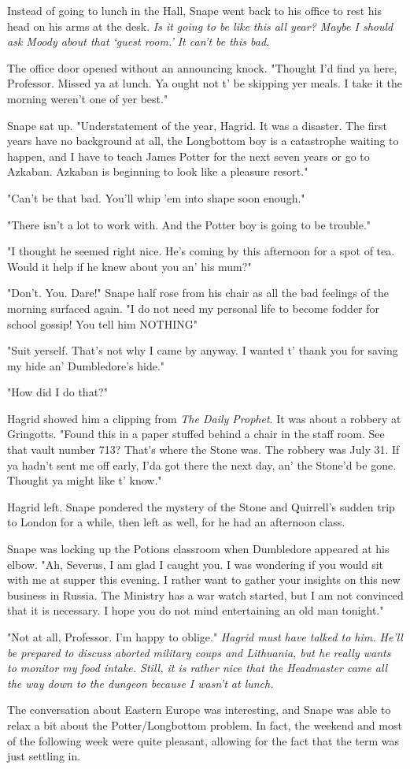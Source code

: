 Instead of going to lunch in the Hall, Snape went back to his office to rest his head on his arms at the desk. \emph{Is it going to be like this all year? Maybe I should ask Moody about that `guest room.' It can't be this bad.}

The office door opened without an announcing knock. "Thought I'd find ya here, Professor. Missed ya at lunch. Ya ought not t' be skipping yer meals. I take it the morning weren't one of yer best."

Snape sat up. "Understatement of the year, Hagrid. It was a disaster. The first years have no background at all, the Longbottom boy is a catastrophe waiting to happen, and I have to teach James Potter for the next seven years or go to Azkaban. Azkaban is beginning to look like a pleasure resort."

"Can't be that bad. You'll whip 'em into shape soon enough."

"There isn't a lot to work with. And the Potter boy is going to be trouble."

"I thought he seemed right nice. He's coming by this afternoon for a spot of tea. Would it help if he knew about you an' his mum?"

"Don't. You. Dare!" Snape half rose from his chair as all the bad feelings of the morning surfaced again. "I do not need my personal life to become fodder for school gossip! You tell him NOTHING"

"Suit yerself. That's not why I came by anyway. I wanted t' thank you for saving my hide an' Dumbledore's hide."

"How did I do that?"

Hagrid showed him a clipping from \emph{The Daily Prophet}. It was about a robbery at Gringotts. "Found this in a paper stuffed behind a chair in the staff room. See that vault number 713? That's where the Stone was. The robbery was July 31. If ya hadn't sent me off early, I'da got there the next day, an' the Stone'd be gone. Thought ya might like t' know."

Hagrid left. Snape pondered the mystery of the Stone and Quirrell's sudden trip to London for a while, then left as well, for he had an afternoon class.

Snape was locking up the Potions classroom when Dumbledore appeared at his elbow. "Ah, Severus, I am glad I caught you. I was wondering if you would sit with me at supper this evening. I rather want to gather your insights on this new business in Russia. The Ministry has a war watch started, but I am not convinced that it is necessary. I hope you do not mind entertaining an old man tonight."

"Not at all, Professor. I'm happy to oblige." \emph{Hagrid must have talked to him. He'll be prepared to discuss aborted military coups and Lithuania, but he really wants to monitor my food intake. Still, it is rather nice that the Headmaster came all the way down to the dungeon because I wasn't at lunch.}

The conversation about Eastern Europe was interesting, and Snape was able to relax a bit about the Potter\slash Longbottom problem. In fact, the weekend and most of the following week were quite pleasant, allowing for the fact that the term was just settling in. 


